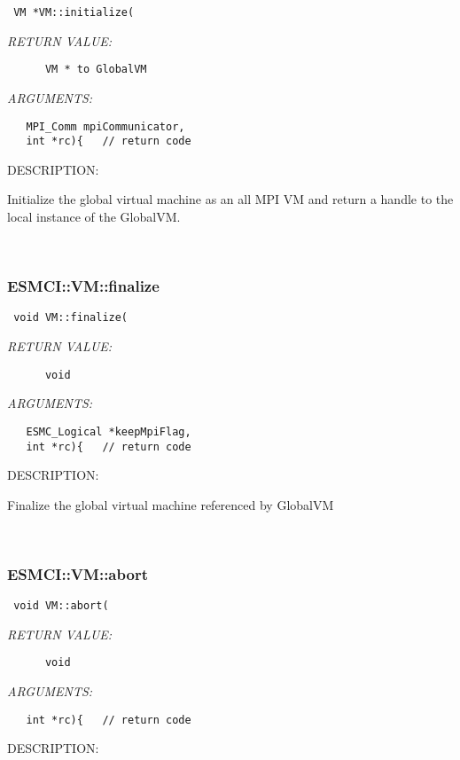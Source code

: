 {  
\begin{verbatim} VM *VM::initialize(\end{verbatim}{\em RETURN VALUE:}
\begin{verbatim}      VM * to GlobalVM\end{verbatim}{\em ARGUMENTS:}
\begin{verbatim}   MPI_Comm mpiCommunicator,
   int *rc){   // return code\end{verbatim}
{\sf DESCRIPTION:\\ }


      Initialize the global virtual machine as an all MPI VM and return a
      handle to the local instance of the GlobalVM.
   
 
\mbox{}\hrulefill\
 
\subsubsection [ESMCI::VM::finalize] {ESMCI::VM::finalize}


  
\begin{verbatim} void VM::finalize(\end{verbatim}{\em RETURN VALUE:}
\begin{verbatim}      void\end{verbatim}{\em ARGUMENTS:}
\begin{verbatim}   ESMC_Logical *keepMpiFlag,
   int *rc){   // return code\end{verbatim}
{\sf DESCRIPTION:\\ }


      Finalize the global virtual machine referenced by GlobalVM
   
 
\mbox{}\hrulefill\
 
\subsubsection [ESMCI::VM::abort] {ESMCI::VM::abort}


  
\begin{verbatim} void VM::abort(\end{verbatim}{\em RETURN VALUE:}
\begin{verbatim}      void\end{verbatim}{\em ARGUMENTS:}
\begin{verbatim}   int *rc){   // return code\end{verbatim}
{\sf DESCRIPTION:\\ }


}
